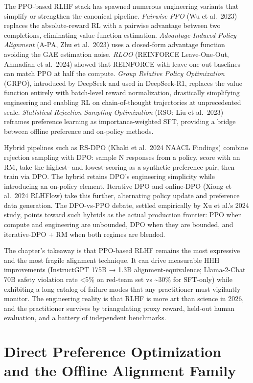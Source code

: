The PPO-based RLHF stack has spawned numerous engineering variants that simplify or strengthen the canonical pipeline. \emph{Pairwise PPO} (Wu et al.~2023) replaces the absolute-reward RL with a pairwise advantage between two completions, eliminating value-function estimation. \emph{Advantage-Induced Policy Alignment} (A-PA, Zhu et al.~2023) uses a closed-form advantage function avoiding the GAE estimation noise. \emph{RLOO} (REINFORCE Leave-One-Out, Ahmadian et al.~2024) showed that REINFORCE with leave-one-out baselines can match PPO at half the compute. \emph{Group Relative Policy Optimization} (GRPO), introduced by DeepSeek and used in DeepSeek-R1, replaces the value function entirely with batch-level reward normalization, drastically simplifying engineering and enabling RL on chain-of-thought trajectories at unprecedented scale. \emph{Statistical Rejection Sampling Optimization} (RSO; Liu et al.~2023) reframes preference learning as importance-weighted SFT, providing a bridge between offline preference and on-policy methods.

Hybrid pipelines such as RS-DPO (Khaki et al.~2024 NAACL Findings) combine rejection sampling with DPO: sample N responses from a policy, score with an RM, take the highest- and lowest-scoring as a synthetic preference pair, then train via DPO. The hybrid retains DPO's engineering simplicity while introducing an on-policy element. Iterative DPO and online-DPO (Xiong et al.~2024 RLHFlow) take this further, alternating policy update and preference data generation. The DPO-vs-PPO debate, settled empirically by Xu et al.'s 2024 study, points toward such hybrids as the actual production frontier: PPO when compute and engineering are unbounded, DPO when they are bounded, and iterative-DPO + RM when both regimes are blended.

The chapter's takeaway is that PPO-based RLHF remains the most expressive and the most fragile alignment technique. It can drive measurable HHH improvements (InstructGPT 175B → 1.3B alignment-equivalence; Llama-2-Chat 70B safety violation rate \textless5\% on red-team set vs \textasciitilde30\% for SFT-only) while exhibiting a long catalog of failure modes that any practitioner must vigilantly monitor. The engineering reality is that RLHF is more art than science in 2026, and the practitioner survives by triangulating proxy reward, held-out human evaluation, and a battery of independent benchmarks.

\section{Direct Preference Optimization and the Offline Alignment Family}\label{direct-preference-optimization-and-the-offline-alignment-family}

